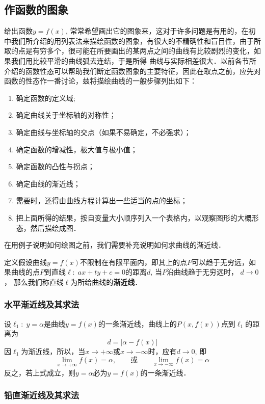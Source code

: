 \subsection{作函数的图象}
给出函数$y=f(x)$, 常常希望画出它的图象来，这对于许多问题是有用的，在初中我们所介绍的用列表法来描绘函数的图象，有很大的不精确性和盲目性，由于所取的点是有穷多个，很可能在所要画出的某两点之间的曲线有比较剧烈的变化，如果我们用比较平滑的曲线弧去连结，于是所得
曲线与实际相差很大．以前各节所介绍的函数性态可以帮助我们断定函数图象的主要特征，因此在取点之前，应先对函数的性态作一番讨论，兹将描绘曲线的一般步骤列出如下：

\begin{enumerate}
\item 确定函数的定义域;
\item 确定曲线关于坐标轴的对称性；
\item 确定曲线与坐标轴的交点（如果不易确定，不必强求）；
\item 确定函数的增减性，极大值与极小值；
\item 确定函数的凸性与拐点；
\item 确定曲线的渐近线；
\item 需要时，还得由曲线方程计算出一些适当的点的坐标；
\item 把上面所得的结果，按自变量大小顺序列入一个表格内，以观察图形的大概形态，然后描绘成图．
\end{enumerate}

在用例子说明如何绘图之前，我们需要补充说明如何求曲线的渐近线．

\begin{blk}
    {定义}假设曲线$y=f(x)$不限制在有限平面内，即其上的点$P$可以趋于无穷远，如果曲线的点$P$到直线$\ell:\; ax+ty+c=0$的距离$d$, 当$P$沿曲线趋于无穷远时，
    $d\to 0$，
    那么我们称直线$\ell$为所给曲线的\textbf{渐近线}．
\end{blk}

\subsubsection{水平渐近线及其求法}

设$\ell_1:\; y=\alpha$是曲线$y=f(x)$的一条渐近线，曲线上的$P(x,f(x))$点到$\ell_1$的距离为
\[d=|\alpha-f(x)|\]
因$\ell_1$为渐近线，所以，当$x\to +\infty$或$x\to -\infty$时，应有$d\to 0$, 即
\[\lim_{x\to+\infty}f(x)=\alpha,\qquad \text{或}\qquad \lim_{x\to -\infty}f(x)=\alpha\]
反之，若上式成立，则$y=\alpha$必为$y=f(x)$的一条渐近线．

\subsubsection{铅直渐近线及其求法}


